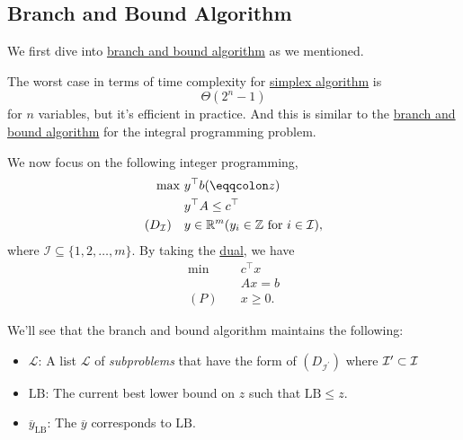 \subsection{Branch and Bound Algorithm}\label{subsec:branch-and-bound}
We first dive into \hyperref[eg:branch-and-bound]{branch and bound algorithm} as we mentioned.
\begin{prev}
	The worst case in terms of time complexity for \hyperref[algo:simplex-algorithm]{simplex algorithm} is
	\[
		\Theta(2^n - 1)
	\]
	for \(n\) variables, but it's efficient in practice. And this is similar to
	the \hyperref[eg:branch-and-bound]{branch and bound algorithm} for the integral programming problem.
\end{prev}

We now focus on the following integer programming,
\begin{align*}
	\max~                   & y^{\top}b(\eqqcolon z)                                                                              \\
	                        & y^{\top}A\leq c^{\top}                                                                              \\
	(D_{\mathcal{I} })\quad & y\in\mathbb{\MakeUppercase{R}}^m(y_{i}\in\mathbb{\MakeUppercase{Z}} \text{ for } i\in \mathcal{I}),
\end{align*}
where \(\mathcal{I} \subseteq \{1, 2, \ldots , m\}\). By taking the \hyperref[def:dual]{dual}, we have
\begin{align*}
	\min~    & c^{\top}x \\
	         & Ax = b    \\
	(P)\quad & x\geq 0.
\end{align*}

We'll see that the branch and bound algorithm maintains the following:
\begin{itemize}
	\item \(\mathcal{L} \): A list \(\mathcal{L} \) of \emph{subproblems} that have the form of \((D_{\mathcal{I^\prime } })\) where \(\mathcal{\MakeUppercase{i}} ^\prime \subset \mathcal{\MakeUppercase{i}}\)
	\item \(\mathrm{LB} \): The current best lower bound on \(z\) such that \(\mathrm{LB}\leq z \).
	\item \(\overline{y}_{\mathrm{LB}}\): The \(\overline{y}\) corresponds to \(\mathrm{LB}\).
\end{itemize}

